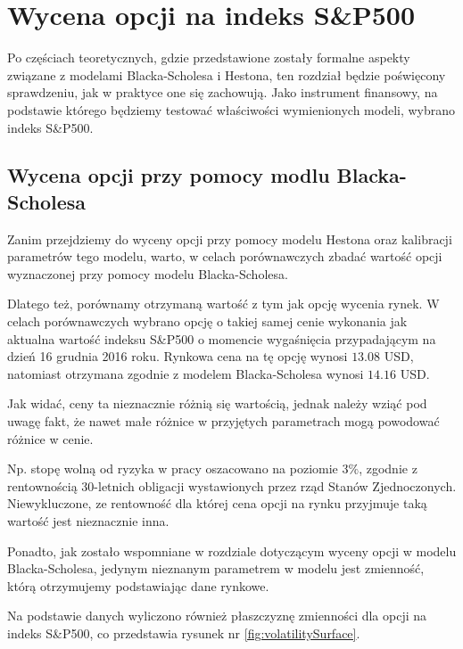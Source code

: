 \documentclass{pracamgr}
\begin{document}
\chapter{Wycena opcji na indeks S\&P500}\label{r:sp}


Po częściach teoretycznych, gdzie przedstawione zostały formalne aspekty związane z modelami 
Blacka-Scholesa i Hestona, ten rozdział będzie poświęcony sprawdzeniu, jak w praktyce one się zachowują.
Jako instrument finansowy, na podstawie którego będziemy testować właściwości wymienionych modeli, 
wybrano indeks S\&P500. 

\section{Wycena opcji przy pomocy modlu Blacka-Scholesa}

Zanim przejdziemy do wyceny opcji  przy pomocy modelu Hestona oraz kalibracji
parametrów tego modelu, warto, w celach porównawczych zbadać wartość opcji 
wyznaczonej przy pomocy modelu Blacka-Scholesa. 


Dlatego też, porównamy otrzymaną wartość z tym jak opcję wycenia rynek.
W celach porównawczych wybrano opcję o takiej samej cenie wykonania jak aktualna wartość indeksu S\&P500 o 
momencie wygaśnięcia przypadającym na dzień 16 grudnia 2016 roku. Rynkowa cena na tę opcję wynosi $13.08$ USD, natomiast otrzymana zgodnie z modelem Blacka-Scholesa wynosi $14.16$ USD.

Jak widać, ceny ta nieznacznie różnią się wartością, jednak należy wziąć pod uwagę fakt, że nawet małe różnice w przyjętych parametrach mogą powodować różnice w cenie. 

Np. stopę wolną od ryzyka w pracy oszacowano na poziomie 3$\%$, zgodnie z rentownością 30-letnich obligacji wystawionych przez rząd Stanów Zjednoczonych. Niewykluczone, ze rentowność dla której cena opcji na rynku przyjmuje taką wartość jest nieznacznie inna.

Ponadto, jak zostało wspomniane w rozdziale dotyczącym wyceny opcji w modelu Blacka-Scholesa,
jedynym nieznanym parametrem w modelu jest zmienność, którą otrzymujemy podstawiając
dane rynkowe. 

Na podstawie danych wyliczono również płaszczyznę zmienności dla 
opcji na indeks S\&P500, co przedstawia rysunek nr \ref{fig:volatilitySurface}. 
\end{document}
